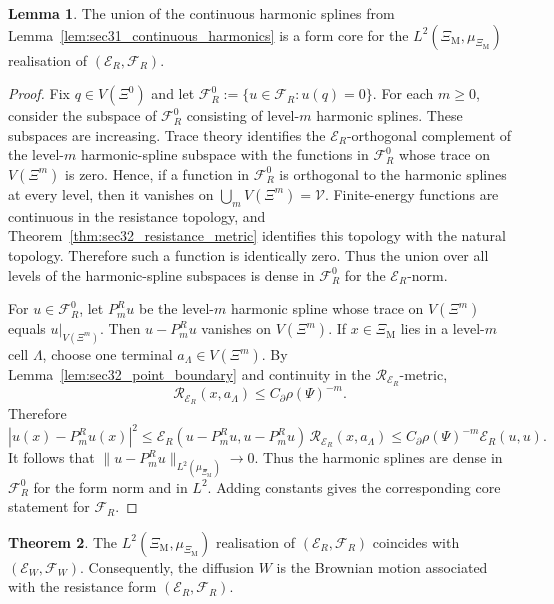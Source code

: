 \documentclass{article}
\theoremstyle{plain}
\theoremstyle{definition}
\newtheorem{theorem}{Theorem}[section]
\newtheorem{lemma}[theorem]{Lemma}
\newcommand{\Reff}{\mathscr{R}}
\begin{document}
\begin{lemma}\label{lem:sec32_common_core}
The union of the continuous harmonic splines from Lemma~\ref{lem:sec31_continuous_harmonics} is a form core for the $L^2(\Xi_{\mathrm M},\mu_{\Xi_{\mathrm M}})$ realisation of $(\mathcal E_R,\mathcal F_R)$.
\end{lemma}

\begin{proof}
Fix $q\in V(\Xi^0)$ and let $\mathcal F_R^0:=\{u\in\mathcal F_R:u(q)=0\}$.
For each $m\ge 0$, consider the subspace of $\mathcal F_R^0$ consisting of level-$m$ harmonic splines.
These subspaces are increasing.
Trace theory identifies the $\mathcal E_R$-orthogonal complement of the level-$m$ harmonic-spline subspace with the functions in $\mathcal F_R^0$ whose trace on $V(\Xi^m)$ is zero.
Hence, if a function in $\mathcal F_R^0$ is orthogonal to the harmonic splines at every level, then it vanishes on $\bigcup_m V(\Xi^m)=\mathscr V$.
Finite-energy functions are continuous in the resistance topology, and Theorem~\ref{thm:sec32_resistance_metric} identifies this topology with the natural topology.
Therefore such a function is identically zero.
Thus the union over all levels of the harmonic-spline subspaces is dense in $\mathcal F_R^0$ for the $\mathcal E_R$-norm.

For $u\in\mathcal F_R^0$, let $P_m^Ru$ be the level-$m$ harmonic spline whose trace on $V(\Xi^m)$ equals $u|_{V(\Xi^m)}$.
Then $u-P_m^Ru$ vanishes on $V(\Xi^m)$.
If $x\in\Xi_{\mathrm M}$ lies in a level-$m$ cell $\Lambda$, choose one terminal $a_{\Lambda}\in V(\Xi^m)$.
By Lemma~\ref{lem:sec32_point_boundary} and continuity in the $\Reff_{\mathcal E_R}$-metric,
\[
\Reff_{\mathcal E_R}(x,a_{\Lambda})\le C_\partial\rho(\Psi)^{-m}.
\]
Therefore
\[
|u(x)-P_m^Ru(x)|^2
\le
\mathcal E_R(u-P_m^Ru,u-P_m^Ru)\,\Reff_{\mathcal E_R}(x,a_{\Lambda})
\le
C_\partial\rho(\Psi)^{-m}\mathcal E_R(u,u).
\]
It follows that $\|u-P_m^Ru\|_{L^2(\mu_{\Xi_{\mathrm M}})}\to 0$.
Thus the harmonic splines are dense in $\mathcal F_R^0$ for the form norm and in $L^2$.
Adding constants gives the corresponding core statement for $\mathcal F_R$.
\end{proof}

\begin{theorem}\label{thm:sec32_brownian_motion}
The $L^2(\Xi_{\mathrm M},\mu_{\Xi_{\mathrm M}})$ realisation of $(\mathcal E_R,\mathcal F_R)$ coincides with $(\mathcal E_W,\mathcal F_W)$.
Consequently, the diffusion $W$ is the Brownian motion associated with the resistance form $(\mathcal E_R,\mathcal F_R)$.
\end{theorem}
\end{document}
